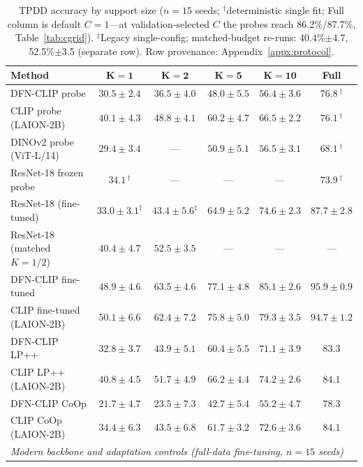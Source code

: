 \documentclass[10pt,a4paper]{article}
\begin{document}
\begin{table}[!ht]
\centering
\caption{TPDD accuracy by support size ($n{=}15$ seeds; $^{\dagger}$deterministic single fit; Full column is default $C{=}1$---at validation-selected $C$ the probes reach 86.2\%/87.7\%, Table~\ref{tab:cgrid}). $^{\ddagger}$Legacy single-config; matched-budget re-runs: 40.4\%$\pm$4.7, 52.5\%$\pm$3.5 (separate row). Row provenance: Appendix~\ref{appx:protocol}.}
\label{tab:main}
\begin{tabular}{lccccc}
\toprule
\textbf{Method} & $\boldsymbol{K=1}$ & $\boldsymbol{K=2}$ & $\boldsymbol{K=5}$ & $\boldsymbol{K=10}$ & \textbf{Full} \\
\midrule
DFN-CLIP probe          & $30.5 \pm 2.4$ & $36.5 \pm 4.0$ & $48.0 \pm 5.5$ & $56.4 \pm 3.6$ & $76.8\,^{\dagger}$ \\
CLIP probe (LAION-2B)   & $40.1 \pm 4.3$ & $48.8 \pm 4.1$ & $60.2 \pm 4.7$ & $66.5 \pm 2.2$ & $76.1\,^{\dagger}$ \\
DINOv2 probe (ViT-L/14) & $29.4 \pm 3.4$ & --- & $50.9 \pm 5.1$ & $56.5 \pm 3.1$ & $68.1\,^{\dagger}$ \\
ResNet-18 frozen probe  & $34.1\,^{\dagger}$ & --- & --- & --- & $73.9\,^{\dagger}$ \\
ResNet-18 (fine-tuned)  & $33.0 \pm 3.1^{\ddagger}$ & $43.4 \pm 5.6^{\ddagger}$ & $64.9 \pm 5.2$ & $74.6 \pm 2.3$ & $87.7 \pm 2.8$ \\
ResNet-18 (matched $K{=}1/2$) & $40.4 \pm 4.7$ & $52.5 \pm 3.5$ & --- & --- & --- \\
DFN-CLIP fine-tuned     & $48.9 \pm 4.6$ & $63.5 \pm 4.6$ & $77.1 \pm 4.8$ & $85.1 \pm 2.6$ & $95.9 \pm 0.9$ \\
CLIP fine-tuned (LAION-2B) & $50.1 \pm 6.6$ & $62.4 \pm 7.2$ & $75.8 \pm 5.0$ & $79.3 \pm 3.5$ & $94.7 \pm 1.2$ \\
DFN-CLIP LP++           & $32.8 \pm 3.7$ & $43.9 \pm 5.1$ & $60.4 \pm 5.5$ & $71.1 \pm 3.9$ & $83.3$ \\
CLIP LP++ (LAION-2B)    & $40.8 \pm 4.5$ & $51.7 \pm 4.9$ & $66.2 \pm 4.4$ & $74.2 \pm 2.6$ & $84.1$ \\
DFN-CLIP CoOp           & $21.7 \pm 4.7$ & $23.5 \pm 7.3$ & $42.7 \pm 5.4$ & $55.2 \pm 4.7$ & $78.3$ \\
CLIP CoOp (LAION-2B)    & $34.4 \pm 6.3$ & $43.5 \pm 6.8$ & $61.7 \pm 3.2$ & $72.6 \pm 3.6$ & $84.1$ \\
\midrule
\multicolumn{6}{l}{\emph{Modern backbone and adaptation controls (full-data fine-tuning, $n{=}15$ seeds)}} \\

\end{tabular}
\end{table}
\end{document}
